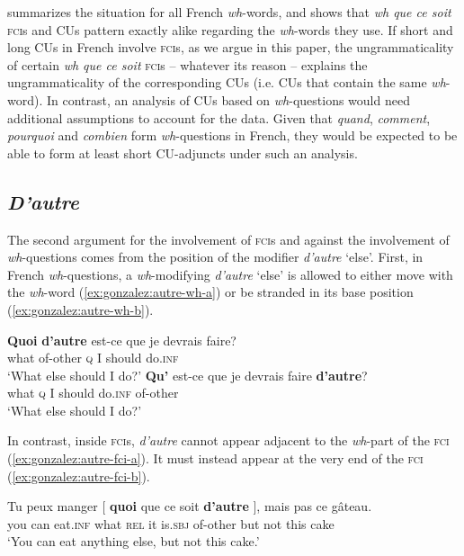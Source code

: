 \documentclass[output=paper]{langscibook}
\begin{document}
 summarizes the  situation for all French \emph{wh}-words, and shows that \emph{wh que ce soit} \textsc{fci}s and CUs pattern exactly alike regarding the \emph{wh}-words they use. If short and long CUs in French involve \textsc{fci}s, as we argue in this paper, the ungrammaticality of certain \emph{wh que ce soit} \textsc{fci}s -- whatever its reason -- explains the ungrammaticality of the corresponding CUs (i.e. CUs that contain the same \emph{wh}-word). In contrast, an analysis of CUs based on \textit{wh}-questions would need additional assumptions to account for the data. Given that \emph{quand}, \emph{comment}, \emph{pourquoi} and \emph{combien} form \emph{wh}-questions in French, they would be expected to be able to form at least short CU-adjuncts under such an analysis.



\subsection{\emph{D'autre}}



The second argument for the involvement of \textsc{fci}s and against the involvement of \emph{wh}-questions comes from the position of the modifier \emph{d'autre} `else'. First, in French \emph{wh}-questions, a \emph{wh}-modifying \emph{d'autre} `else' is allowed to either move with the \emph{wh}-word (\ref{ex:gonzalez:autre-wh-a}) or be stranded in its base position (\ref{ex:gonzalez:autre-wh-b}).

\ea 
    \ea \label{ex:gonzalez:autre-wh-a}
    \gll \textbf{Quoi} \textbf{d'autre} {est-ce que} je devrais faire? \\
 what of-other \textsc{q} I should do.\textsc{inf} \\ \jambox{[Q]}
    \glt `What else should I do?' 
    \ex \label{ex:gonzalez:autre-wh-b}
    \gll \textbf{Qu'} {est-ce que} je devrais faire \textbf{d'autre}? \\
 what  \textsc{q} I should do.\textsc{inf} of-other \\ \jambox{[Q]}
    \glt `What else should I do?' 
    \z
\z

In contrast, inside \textsc{fci}s, \emph{d'autre} cannot appear adjacent to the \emph{wh}-part of the \textsc{fci} (\ref{ex:gonzalez:autre-fci-a}). It must instead appear at the very end of the \textsc{fci} (\ref{ex:gonzalez:autre-fci-b}).


\ea \label{ex:gonzalez:autre-fci}
\ex \label{ex:gonzalez:autre-fci-b}
\gll Tu peux manger $[$ \textbf{quoi} que ce soit \textbf{d'autre} $]$, mais pas ce gâteau. \\
you can eat.\textsc{inf} {} what \textsc{rel} it is.\textsc{sbj} of-other {} but not this cake \\ 
\glt `You can eat anything else, but not this cake.'
\z 
\end{document}
